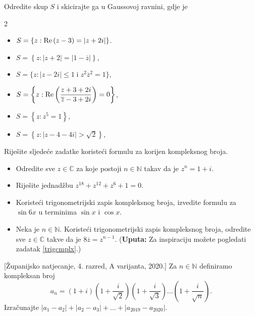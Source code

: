 \begin{exercise}{\unskip}
Odredite skup \(S\) i skicirajte ga u Gaussovoj ravnini, gdje je
\begin{multicols}{2}
\begin{itemize}
\item[a)] \(S=\{z : \operatorname{Re}{(z-3)}=|z+2i|\}\).
\item[b)] \(S=\left\{z : |z+2|=|1-\overline{z}|\right\}\),
\item[c)] \(S=\{z : |z-2i|\leq 1 \; \mathrm{i} \; z^2\overline{z}^2=1\}\),
\item[d)] \(S=\left\{z : \operatorname{Re}{\left(\dfrac{z+3+2i}{\overline{z}-3+2i}\right)}=0\right\}\),
\item[e)] \(S=\left\{z : z^5=1\right\}\),
\item[f)] \(S=\left\{z : |z-4-4i|>\sqrt{2}\right\}\),
\end{itemize}
\end{multicols}
\end{exercise}
\begin{exercise}{\unskip} Riješite sljedeće zadatke koristeći formulu za korijen kompleksnog broja.
\begin{itemize}
\item[a)] Odredite sve $z\in \mathbb{C}$ za koje postoji $n\in \mathbb{N}$ takav da je $z^n=1+i$.
\item[b)] Riješite jednadžbu $z^{18}+z^{12}+z^6+1=0$. 
\end{itemize}
\end{exercise}
\begin{exercise}{\unskip}
\begin{itemize}
\item[a)] Koristeći trigonometrijski zapis kompleksnog broja, izvedite formulu za $\sin{6x}$ u terminima $\sin{x}$ i $\cos{x}$.
\item[b)] Neka je $n\in \mathbb{N}$. Koristeći trigonometrijski zapis kompleksnog broja, odredite sve $z\in \mathbb{C}$ takve da je $8\overline{z}=z^{n-1}$. (\textbf{Uputa:} Za inspiraciju možete pogledati zadatak \ref{trigcmplx}.)
\end{itemize}
\end{exercise}
\begin{exercise}{\unskip}[Županijsko natjecanje, 4. razred, A varijanta, 2020.]
Za \(n\in \mathbb{N}\) definiramo kompleksan broj
\[a_n=(1+i)\left(1+\dfrac{i}{\sqrt{2}}\right)\left(1+\dfrac{i}{\sqrt{3}}\right)\dots \left(1+\dfrac{i}{\sqrt{n}}\right).\]
Izračunajte \(|a_1-a_2|+|a_2-a_3|+\dots+|a_{2019}-a_{2020}|\).
\end{exercise}
